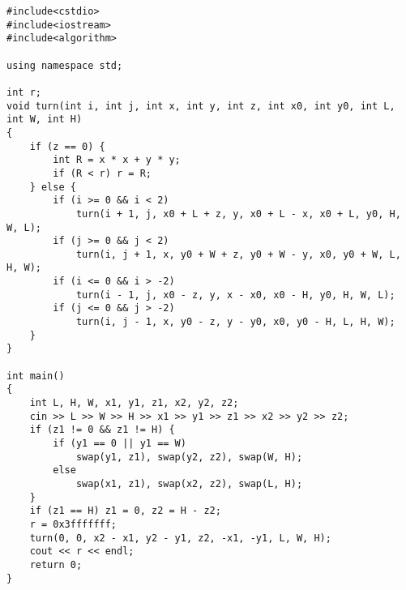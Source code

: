 \begin{lstlisting}
#include<cstdio>
#include<iostream>
#include<algorithm>

using namespace std;

int r;
void turn(int i, int j, int x, int y, int z, int x0, int y0, int L, int W, int H)
{
	if (z == 0) {
		int R = x * x + y * y;
		if (R < r) r = R;
	} else {
		if (i >= 0 && i < 2)
			turn(i + 1, j, x0 + L + z, y, x0 + L - x, x0 + L, y0, H, W, L);
		if (j >= 0 && j < 2)
			turn(i, j + 1, x, y0 + W + z, y0 + W - y, x0, y0 + W, L, H, W);
		if (i <= 0 && i > -2)
			turn(i - 1, j, x0 - z, y, x - x0, x0 - H, y0, H, W, L);
		if (j <= 0 && j > -2)
			turn(i, j - 1, x, y0 - z, y - y0, x0, y0 - H, L, H, W);
	}
}

int main()
{
	int L, H, W, x1, y1, z1, x2, y2, z2;
	cin >> L >> W >> H >> x1 >> y1 >> z1 >> x2 >> y2 >> z2;
	if (z1 != 0 && z1 != H) {
		if (y1 == 0 || y1 == W)
			swap(y1, z1), swap(y2, z2), swap(W, H);
		else
			swap(x1, z1), swap(x2, z2), swap(L, H);
	}
	if (z1 == H) z1 = 0, z2 = H - z2;
	r = 0x3fffffff; 
	turn(0, 0, x2 - x1, y2 - y1, z2, -x1, -y1, L, W, H);
	cout << r << endl;
	return 0;
}
\end{lstlisting}
